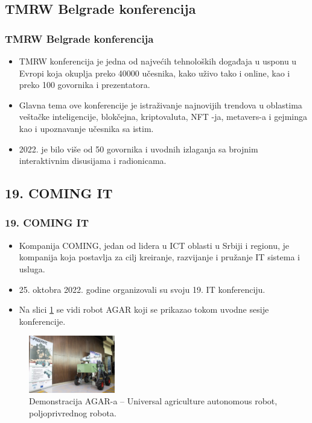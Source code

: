 \documentclass{beamer}
\begin{document}
\subsection{TMRW Belgrade konferencija}
\begin{frame}[fragile]\frametitle{TMRW Belgrade konferencija}

\begin{itemize}
    \item TMRW konferencija je jedna od najvećih tehnoloških događaja u usponu u Evropi koja okuplja preko 40000 učesnika, kako uživo tako i online, kao i preko 100 govornika i prezentatora.
    \item Glavna tema ove konferencije je istraživanje najnovijih trendova u oblastima veštačke inteligencije, blokčejna, kriptovaluta, NFT -ja, metavers-a i gejminga kao i upoznavanje učesnika sa istim.
    \item 2022. je bilo više od 50 govornika i uvodnih izlaganja sa brojnim interaktivnim disusijama i radionicama.
\end{itemize}

\end{frame}
\subsection{19. COMING IT}
\begin{frame}[fragile]\frametitle{19. COMING IT}

\begin{itemize}
    \item Kompanija COMING, jedan od lidera u ICT oblasti u Srbiji i regionu, je kompanija koja postavlja za cilj kreiranje, razvijanje i pružanje IT sistema i usluga.
    \item 25. oktobra 2022. godine organizovali su svoju 19. IT konferenciju.
    \item Na slici \ref{fig:agar} se vidi robot AGAR koji se prikazao tokom uvodne sesije konferencije.
\end{itemize}

\begin{figure}[h!]
        \centering\includegraphics[height=2.5cm]{slike/agar.jpg} 
        \caption{Demonstracija AGAR-a – Universal agriculture autonomous robot, poljoprivrednog robota.}
        \label{fig:agar}
\end{figure}

\end{frame}
\end{document}
